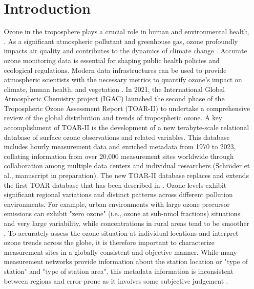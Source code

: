 \documentclass[gmd, manuscript]{copernicus}
\providecommand{\DIFaddtex}[1]{{\protect\color{blue}\uwave{#1}}} %
\providecommand{\DIFaddbegin}{} %
\providecommand{\DIFaddend}{} %
\providecommand{\DIFadd}[1]{\texorpdfstring{\DIFaddtex{#1}}{#1}} %
\newcommand{\DIFaddincludegraphics}[2][]{{\color{blue}\fbox{\DIFOincludegraphics[#1]{#2}}}} %
\DeclareRobustCommand{\DIFaddbegin}{\DIFOaddbegin \let\includegraphics\DIFaddincludegraphics} %
\DeclareRobustCommand{\DIFaddend}{\DIFOaddend \let\includegraphics\DIFOincludegraphics} %
\begin{document}
\section{Introduction} 
Ozone in the troposphere plays a crucial role in human and environmental health, \citep{post2012variation, griffiths2021tropospheric}. As a significant atmospheric pollutant and greenhouse gas, ozone profoundly impacts air quality and contributes to the dynamics of climate change  \citep{madronich2023changes, orru2013impact}.
Accurate ozone monitoring data is essential for shaping public health policies and ecological regulations. Modern data infrastructures can be used to provide atmospheric scientists with the necessary metrics to quantify ozone's impact on climate, human health, and vegetation \citep{gaudel2018tropospheric, flemingchapter, mills2018nitrogen, teakles2017impacts, cooper2014global, monks2015tropospheric, schultz2015global}. 
In 2021, the International Global Atmospheric Chemistry project (IGAC) launched the second phase of the Tropospheric Ozone Assessment Report (TOAR-II) to undertake a comprehensive review of the global distribution and trends of tropospheric ozone. A key accomplishment of TOAR-II is the development of a new terabyte-scale relational database of surface ozone observations and related variables. This database includes hourly measurement data and enriched metadata from 1970 to 2023, collating information from over 20,000 measurement sites worldwide through collaboration among multiple data centers and individual researchers (Schröder et al., manuscript in preparation). The new TOAR-II database replaces and extends the first TOAR database that has been described in \cite{schultz2017tropospheric}. 
Ozone levels exhibit significant regional variations and distinct patterns across different pollution environments. For example, urban environments with large ozone precursor emissions can exhibit "zero ozone" (i.e., ozone at sub-nmol fractions) situations and very large variability, while concentrations in rural areas tend to be smoother \citep{zhou2022spatiotemporal, Schultz2017}. To accurately assess the ozone situation at individual locations and interpret ozone trends across the globe, it is therefore important to characterize measurement sites in a globally consistent and objective manner. While many measurement networks provide information about the station location or "type of station" and "type of station area", %
this metadata information is inconsistent between regions and error-prone as it involves some subjective judgement \DIFaddbegin \DIFadd{\mbox{%
\citep[c.f.,][]{tapia2016new}}\hskip0pt%
}\DIFaddend . 
\end{document}
